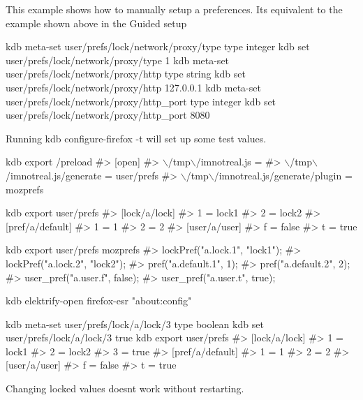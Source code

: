 This example shows how to manually setup a preferences. It\textquotesingle{}s equivalent to the example shown above in the {\ttfamily Guided setup}


\begin{DoxyCode}
kdb meta-set user/prefs/lock/network/proxy/type type integer
kdb set user/prefs/lock/network/proxy/type 1
kdb meta-set user/prefs/lock/network/proxy/http type string
kdb set user/prefs/lock/network/proxy/http 127.0.0.1
kdb meta-set user/prefs/lock/network/proxy/http\_port type integer
kdb set user/prefs/lock/network/proxy/http\_port 8080
\end{DoxyCode}


Running {\ttfamily kdb configure-\/firefox -\/t} will set up some test values.


\begin{DoxyCode}
kdb export /preload
#> [open]
#> \(\backslash\)/tmp\(\backslash\)/imnotreal.js =
#> \(\backslash\)/tmp\(\backslash\)/imnotreal.js/generate = user/prefs
#> \(\backslash\)/tmp\(\backslash\)/imnotreal.js/generate/plugin = mozprefs

kdb export user/prefs
#> [lock/a/lock]
#> 1 = lock1
#> 2 = lock2
#> [pref/a/default]
#> 1 = 1
#> 2 = 2
#> [user/a/user]
#> f = false
#> t = true

kdb export user/prefs mozprefs
#> lockPref("a.lock.1", "lock1");
#> lockPref("a.lock.2", "lock2");
#> pref("a.default.1", 1);
#> pref("a.default.2", 2);
#> user\_pref("a.user.f", false);
#> user\_pref("a.user.t", true);
\end{DoxyCode}



\begin{DoxyCode}
kdb elektrify-open firefox-esr "about:config"
\end{DoxyCode}





\begin{DoxyCode}
kdb meta-set user/prefs/lock/a/lock/3 type boolean
kdb set user/prefs/lock/a/lock/3 true
kdb export user/prefs
#> [lock/a/lock]
#> 1 = lock1
#> 2 = lock2
#> 3 = true
#> [pref/a/default]
#> 1 = 1
#> 2 = 2
#> [user/a/user]
#> f = false
#> t = true
\end{DoxyCode}




Changing locked values doesn\textquotesingle{}t work without restarting. 